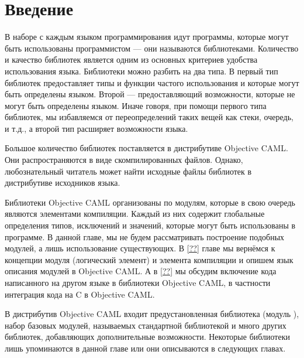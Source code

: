 \section {Введение}
\label{sec:intro_8}

В наборе с каждым языком программирования идут программы, которые могут быть 
использованы программистом --- они называются библиотеками. Количество и 
качество библиотек является одним из основных критериев удобства использования 
языка. Библиотеки можно разбить на два типа. В первый тип библиотек 
предоставляет типы и функции частого использования и которые могут быть 
определены языком. Второй --- предоставляющий возможности, которые не могут 
быть определены языком. Иначе говоря, при помощи первого типа библиотек, мы 
избавляемся от переопределений таких вещей как стеки, очередь, и т.д., а второй 
тип расширяет возможности языка.

Большое количество библиотек поставляется в дистрибутиве Objective CAML. Они 
распространяются в виде скомпилированных файлов. Однако, любознательный читатель 
может найти исходные файлы библиотек в дистрибутиве исходников языка.

Библиотеки Objective CAML организованы по модулям, которые в свою очередь 
являются элементами компиляции. Каждый из них содержит глобальные определения 
типов, исключений и значений, которые могут быть использованы в программе. В 
данной главе, мы не будем рассматривать построение подобных модулей, а лишь 
использование существующих. В \ref{??} главе мы вернёмся к концепции модуля 
(логический элемент) и элемента компиляции и опишем язык описания модулей в 
Objective CAML. А в \ref{??} мы обсудим включение кода написанного на другом 
языке в библиотеки Objective CAML, в частности интеграция кода на C в Objective 
CAML.

В дистрибутив Objective CAML входит предустановленная библиотека (модуль 
), набор базовых модулей, называемых стандартной библиотекой и 
много других библиотек, добавляющих дополнительные возможности. Некоторые 
библиотеки лишь упоминаются в данной главе или они описываются в следующих 
главах.
